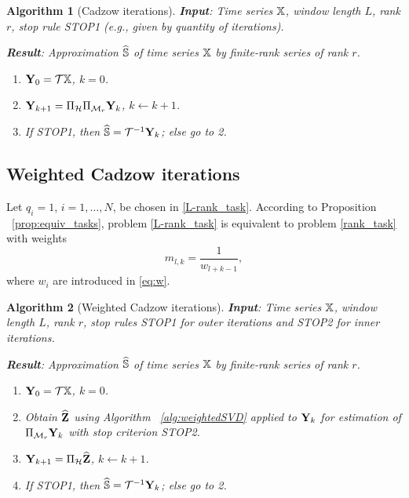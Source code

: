 \documentclass[sii]{ipart}
\newtheorem{algorithm}{Algorithm}
\begin{document}
\begin{algorithm}[Cadzow iterations]
	\textbf{Input}: Time series $\mathbb{X}$, window length $L$, rank $r$,
	stop rule STOP1 (e.g., given by quantity of iterations).
	
	\textbf{Result}:
	Approximation $\widehat{\mathbb{S}}$ of time series $\mathbb{X}$ by finite-rank series of rank $r$.
	
	\begin{enumerate}
		\item
		$\mathbf{Y}_0 = \mathcal{T} \mathbb{X}$, $k=0$.
		\item
		$\mathbf{Y}_{k+1} = \Pi_{\mathcal{H}}  \Pi_{\mathcal{M}_r} \mathbf{Y}_{k}$, $k\leftarrow k+1$.
		\item
		If STOP1, then $\widehat{\mathbb{S}} = \mathcal{T}^{-1} \mathbf{Y}_k$; else go to 2.
	\end{enumerate}
\end{algorithm}


\subsection{Weighted Cadzow iterations}

Let $q_{i}=1$, $i = 1, \ldots, N$, be chosen in \eqref{L-rank_task}. According to Proposition ~\ref{prop:equiv_tasks},  problem \eqref{L-rank_task} is equivalent to problem \eqref{rank_task} with weights
\begin{equation}
\label{Mw}
m_{l, k} = \frac{1}{w_{l + k - 1}},
\end{equation}
where $w_i$ are introduced in \eqref{eq:w}.

\begin{algorithm}[Weighted Cadzow iterations]\label{alg:WCIt}
	\textbf{Input}: Time series $\mathbb{X}$, window length $L$, rank $r$,
	stop rules STOP1 for outer iterations and STOP2 for inner iterations.
	
	\textbf{Result}:
	Approximation $\widehat{\mathbb{S}}$ of time series $\mathbb{X}$ by finite-rank series of rank $r$.
	
	\begin{enumerate}
		\item
		$\mathbf{Y}_0 = \mathcal{T} \mathbb{X}$, $k=0$.
		\item
		Obtain $\widehat{\mathbf{Z}}$ using Algorithm ~\ref{alg:weightedSVD} applied to $\mathbf{Y}_k$ for estimation of $\Pi_{\mathcal{M}_r} \mathbf{Y}_{k}$ with stop criterion STOP2.
		\item
		$\mathbf{Y}_{k+1} = \Pi_{\mathcal{H}}  \widehat{\mathbf{Z}}$, $k\leftarrow k+1$.
		\item
		If STOP1, then $\widehat{\mathbb{S}} = \mathcal{T}^{-1} \mathbf{Y}_k$; else go to 2.
	\end{enumerate}
\end{algorithm}
\end{document}
